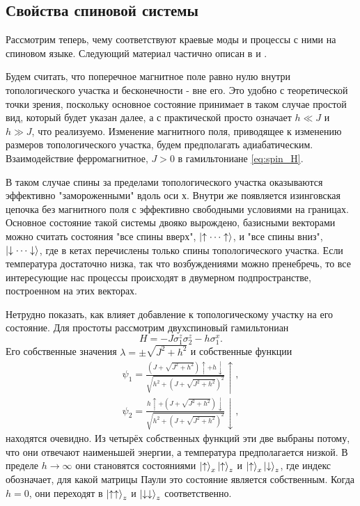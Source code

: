 \documentclass[a4paper,12pt]{article}
\theoremstyle{plain} %
\theoremstyle{definition} %
\theoremstyle{remark} %
\begin{document}
\pagebreak

\subsection{Свойства спиновой системы}

Рассмотрим теперь, чему соответствуют краевые моды и процессы с ними на спиновом языке. Следующий материал частично описан в \cite{arrays} и \cite{main}.

Будем считать, что поперечное магнитное поле равно нулю внутри топологического участка и бесконечности - вне его. Это удобно с теоретической точки зрения, поскольку основное состояние принимает в таком случае простой вид, который будет указан далее, а с практической просто означает $h \ll J$ и $h \gg J$, что реализуемо. Изменение магнитного поля, приводящее к изменению размеров топологического участка, будем предполагать адиабатическим. Взаимодействие ферромагнитное, $J>0$ в гамильтониане \ref{eq:spin_H}.

В таком случае спины за пределами топологического участка оказываются эффективно "замороженными"$ $ вдоль оси $х$. Внутри же появляется изинговская цепочка без магнитного поля с эффективно свободными условиями на границах. Основное состояние такой системы двояко вырождено, базисными векторами можно считать состояния "все спины вверх"$ $, $\ket{\uparrow \dotsm \uparrow}$, и "все спины вниз"$ $, $\ket{\downarrow \dotsm \downarrow}$, где в кетах перечислены только спины топологического участка. Если температура достаточно низка, так что возбуждениями можно пренебречь, то все интересующие нас процессы происходят в двумерном подпространстве, построенном на этих векторах. 

Нетрудно показать, как влияет добавление к топологическому участку на его состояние. Для простоты рассмотрим двухспиновый гамильтониан
\begin{equation}
    H = -J \sigma_1^z \sigma_2^z - h \sigma_1^x.
    \label{eq:32_model_H}
\end{equation}
Его собственные значения $\lambda = \pm \sqrt{J^2 + h^2}$ и собственные функции
\begin{gather*}
    \psi_1 = \frac{\left( J + \sqrt{J^2 + h^2} \right) \uparrow + h \downarrow}{\sqrt{h^2 + \left(J + \sqrt{J^2 + h^2} \right)^2}} \uparrow, \\
    \psi_2 = \frac{ h \uparrow + \left( J + \sqrt{J^2 + h^2} \right) \downarrow}{\sqrt{h^2 + \left(J + \sqrt{J^2 + h^2} \right)^2}} \downarrow,
\end{gather*}
находятся очевидно. Из четырёх собственных функций эти две выбраны потому, что они отвечают наименьшей энергии, а температура предполагается низкой. В пределе $h \rightarrow \infty$ они становятся состояниями $\ket{\uparrow}_x \ket{\uparrow}_z$ и $\ket{\uparrow}_x \ket{\downarrow}_z$, где индекс обозначает, для какой матрицы Паули это состояние является собственным. Когда $h = 0$, они переходят в $\ket{\uparrow \uparrow}_z$ и $\ket{\downarrow \downarrow}_z$ соответственно.
\end{document}
